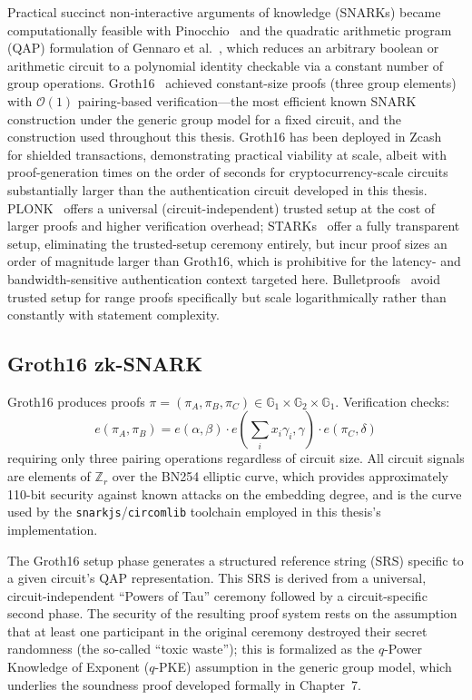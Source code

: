 \documentclass[12pt,a4paper,oneside]{report}
\begin{document}
Practical succinct non-interactive arguments of knowledge (SNARKs) became
computationally feasible with Pinocchio~\cite{parno13} and the quadratic
arithmetic program (QAP) formulation of Gennaro et al.~\cite{gennaro13},
which reduces an arbitrary boolean or arithmetic circuit to a polynomial
identity checkable via a constant number of group operations. Groth16~\cite{groth16}
achieved constant-size proofs (three group elements) with $\mathcal{O}(1)$
pairing-based verification---the most efficient known SNARK construction
under the generic group model for a fixed circuit, and the construction
used throughout this thesis. Groth16 has been deployed in
Zcash~\cite{zcash14} for shielded transactions, demonstrating practical
viability at scale, albeit with proof-generation times on the order of
seconds for cryptocurrency-scale circuits substantially larger than the
authentication circuit developed in this thesis. PLONK~\cite{plonk} offers
a universal (circuit-independent) trusted setup at the cost of larger
proofs and higher verification overhead; STARKs~\cite{starks} offer a
fully transparent setup, eliminating the trusted-setup ceremony entirely,
but incur proof sizes an order of magnitude larger than Groth16, which is
prohibitive for the latency- and bandwidth-sensitive authentication context
targeted here. Bulletproofs~\cite{bulletproofs} avoid trusted setup for
range proofs specifically but scale logarithmically rather than constantly
with statement complexity.

\subsection{Groth16 zk-SNARK}
Groth16 produces proofs $\pi = (\pi_A, \pi_B, \pi_C) \in
\mathbb{G}_1 \times \mathbb{G}_2 \times \mathbb{G}_1$. Verification checks:
\begin{equation}
  e(\pi_A, \pi_B) = e(\alpha, \beta) \cdot
  e\!\left(\sum_i x_i \gamma_i, \gamma\right) \cdot e(\pi_C, \delta)
\end{equation}
requiring only three pairing operations regardless of circuit size. All
circuit signals are elements of $\mathbb{Z}_r$ over the BN254 elliptic
curve, which provides approximately 110-bit security against known
attacks on the embedding degree, and is the curve used by the
\texttt{snarkjs}/\texttt{circomlib} toolchain employed in this thesis's
implementation.

The Groth16 setup phase generates a structured reference string (SRS)
specific to a given circuit's QAP representation. This SRS is derived from
a universal, circuit-independent ``Powers of Tau'' ceremony followed by a
circuit-specific second phase. The security of the resulting proof system
rests on the assumption that at least one participant in the original
ceremony destroyed their secret randomness (the so-called ``toxic waste'');
this is formalized as the $q$-Power Knowledge of Exponent ($q$-PKE)
assumption in the generic group model, which underlies the soundness proof
developed formally in Chapter~7.
\end{document}
